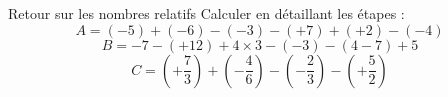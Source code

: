 
\begin{frame}{Retour sur les nombres relatifs}
Calculer en détaillant les étapes : 
$$A=(-5)+(-6)-(-3)-(+7)+(+2)-(-4)$$
$$B=-7-(+12)+4\times 3 -(-3)-(4-7)+5$$
$$C=\left(+\dfrac{7}{3}\right)+\left(-\dfrac{4}{6}\right)-\left(-\dfrac{2}{3}\right)-\left(+\dfrac{5}{2}\right)$$

\end{frame}